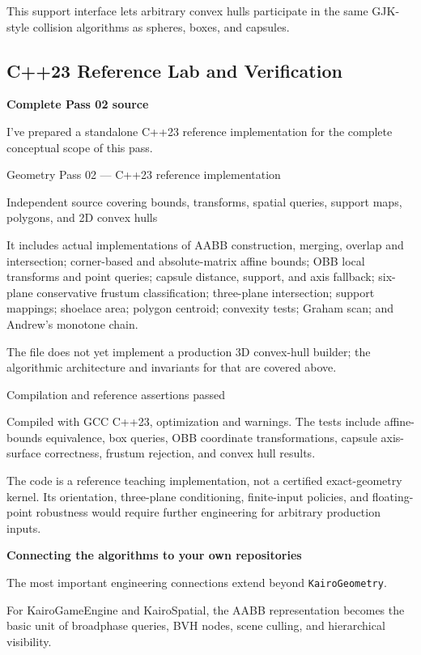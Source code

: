 This support interface lets arbitrary convex hulls participate in the same GJK-style collision algorithms as spheres, boxes, and capsules.

\subsection{C++23 Reference Lab and Verification}\label{04-visual-computing-ii-ch022-c23-reference-lab-and-verification}

\textbf{Complete Pass 02 source}

I've prepared a standalone C++23 reference implementation for the complete conceptual scope of this pass.

Geometry Pass 02 --- C++23 reference implementation

Independent source covering bounds, transforms, spatial queries, support maps, polygons, and 2D convex hulls

It includes actual implementations of AABB construction, merging, overlap and intersection; corner-based and absolute-matrix affine bounds; OBB local transforms and point queries; capsule distance, support, and axis fallback; six-plane conservative frustum classification; three-plane intersection; support mappings; shoelace area; polygon centroid; convexity tests; Graham scan; and Andrew's monotone chain.

The file does not yet implement a production 3D convex-hull builder; the algorithmic architecture and invariants for that are covered above.

Compilation and reference assertions passed

Compiled with GCC C++23, optimization and warnings. The tests include affine-bounds equivalence, box queries, OBB coordinate transformations, capsule axis-surface correctness, frustum rejection, and convex hull results.

The code is a reference teaching implementation, not a certified exact-geometry kernel. Its orientation, three-plane conditioning, finite-input policies, and floating-point robustness would require further engineering for arbitrary production inputs.

\textbf{Connecting the algorithms to your own repositories}

The most important engineering connections extend beyond \texttt{KairoGeometry}.

For KairoGameEngine and KairoSpatial, the AABB representation becomes the basic unit of broadphase queries, BVH nodes, scene culling, and hierarchical visibility.

